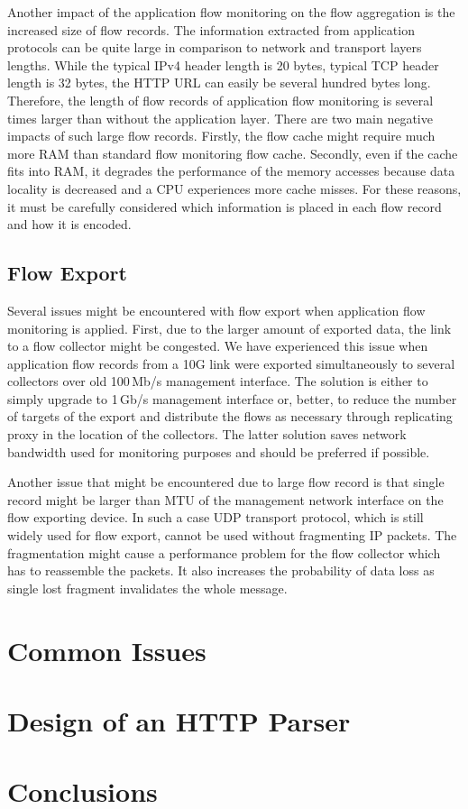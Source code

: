 Another impact of the application flow monitoring on the flow aggregation is the increased size of flow records. The information extracted from application protocols can be quite large in comparison to network and transport layers lengths. While the typical IPv4 header length is 20 bytes, typical TCP header length is 32 bytes, the HTTP URL can easily be several hundred bytes long. Therefore, the length of flow records of application flow monitoring is several times larger than without the application layer. There are two main negative impacts of such large flow records. Firstly, the flow cache might require much more RAM than standard flow monitoring flow cache. Secondly, even if the cache fits into RAM, it degrades the performance of the memory accesses because data locality is decreased and a CPU experiences more cache misses. For these reasons, it must be carefully considered which information is placed in each flow record and how it is encoded.

\subsection{Flow Export}

Several issues might be encountered with flow export when application flow monitoring is applied. First, due to the larger amount of exported data, the link to a flow collector might be congested. We have experienced this issue when application flow records from a 10G link were exported simultaneously to several collectors over old 100\,Mb/s management interface. The solution is either to simply upgrade to 1\,Gb/s management interface or, better, to reduce the number of targets of the export and distribute the flows as necessary through replicating proxy in the location of the collectors. The latter solution saves network bandwidth used for monitoring purposes and should be preferred if possible.

Another issue that might be encountered due to large flow record is that single record might be larger than MTU of the management network interface on the flow exporting device. In such a case UDP transport protocol, which is still widely used for flow export, cannot be used without fragmenting IP packets. The fragmentation might cause a performance problem for the flow collector which has to reassemble the packets. It also increases the probability of data loss as single lost fragment invalidates the whole message.


\section{Common Issues} %


\section{Design of an HTTP Parser} %

\section{Conclusions}\label{sec:app-conclusions}